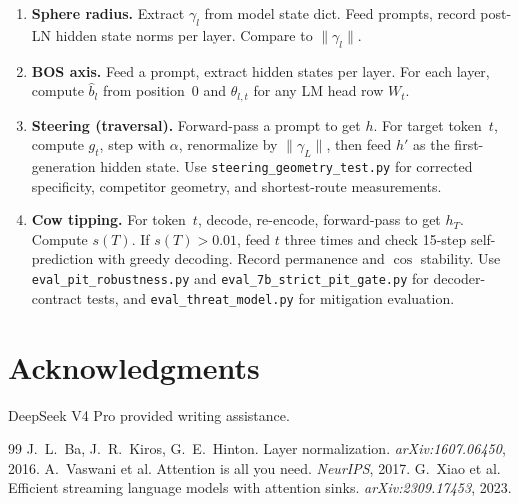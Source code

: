 \documentclass{article}
\begin{document}
\begin{enumerate}
\item \textbf{Sphere radius.} Extract $\gamma_l$ from model state dict. Feed
prompts, record post-LN hidden state norms per layer. Compare to $\|\gamma_l\|$.

\item \textbf{BOS axis.} Feed a prompt, extract hidden states per layer. For
each layer, compute $\hat{b}_l$ from position~0 and $\theta_{l,t}$ for any LM
head row $W_t$.

\item \textbf{Steering (traversal).} Forward-pass a prompt to get $h$. For
target token~$t$, compute $g_t$, step with $\alpha$, renormalize by
$\|\gamma_L\|$, then feed $h'$ as the first-generation hidden state. Use
\texttt{steering\_geometry\_test.py} for corrected specificity, competitor
geometry, and shortest-route measurements.

\item \textbf{Cow tipping.} For token~$t$, decode, re-encode, forward-pass to
get $h_T$. Compute $s(T)$. If $s(T) > 0.01$, feed $t$ three times and check
15-step self-prediction with greedy decoding. Record permanence and $\cos$
stability. Use \texttt{eval\_pit\_robustness.py} and
\texttt{eval\_7b\_strict\_pit\_gate.py} for decoder-contract tests, and
\texttt{eval\_threat\_model.py} for mitigation evaluation.
\end{enumerate}

\section*{Acknowledgments}
DeepSeek V4 Pro provided writing assistance.

\begin{thebibliography}{99}
 J.~L.~Ba, J.~R.~Kiros, G.~E.~Hinton. Layer normalization. \emph{arXiv:1607.06450}, 2016.
 A.~Vaswani et al. Attention is all you need. \emph{NeurIPS}, 2017.
 G.~Xiao et al. Efficient streaming language models with attention sinks. \emph{arXiv:2309.17453}, 2023.
\end{thebibliography}
\end{document}
